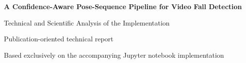 \documentclass[11pt,a4paper]{article}
\begin{document}
\begin{titlepage}
\centering
\vspace*{28mm}
{\LARGE\bfseries A Confidence-Aware Pose-Sequence Pipeline for Video Fall Detection\par}
\vspace{8mm}
{\Large Technical and Scientific Analysis of the Implementation\par}
\vfill
{\large Publication-oriented technical report\par}
\vspace{10mm}
{\large Based exclusively on the accompanying Jupyter notebook implementation\par}
\vspace*{20mm}
\end{titlepage}

\tableofcontents
\clearpage
\end{document}

